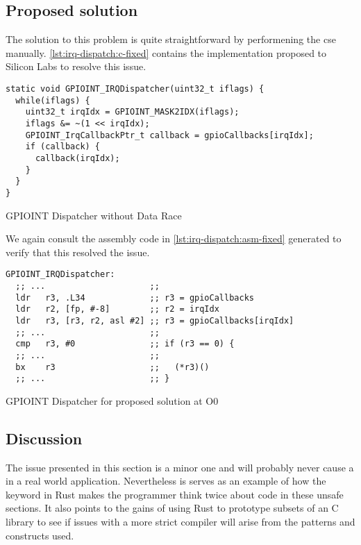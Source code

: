 \subsection{Proposed solution}

The solution to this problem is quite straightforward by performening the \gls{cse} manually.
\autoref{lst:irq-dispatch:c-fixed} contains the implementation proposed to Silicon Labs to resolve this issue.

\begin{listing}[H]
  \begin{verbatim}
static void GPIOINT_IRQDispatcher(uint32_t iflags) {
  while(iflags) {
    uint32_t irqIdx = GPIOINT_MASK2IDX(iflags);
    iflags &= ~(1 << irqIdx);
    GPIOINT_IrqCallbackPtr_t callback = gpioCallbacks[irqIdx];
    if (callback) {
      callback(irqIdx);
    }
  }
}
  \end{verbatim}
  \caption{GPIOINT Dispatcher without Data Race}
  \label{lst:irq-dispatch:c-fixed}
\end{listing}

We again consult the assembly code in \autoref{lst:irq-dispatch:asm-fixed} generated to verify that this resolved the issue.

\begin{listing}[H]
  \begin{verbatim}
GPIOINT_IRQDispatcher:
  ;; ...                     ;;
  ldr   r3, .L34             ;; r3 = gpioCallbacks
  ldr   r2, [fp, #-8]        ;; r2 = irqIdx
  ldr   r3, [r3, r2, asl #2] ;; r3 = gpioCallbacks[irqIdx]
  ;; ...                     ;;
  cmp   r3, #0               ;; if (r3 == 0) {
  ;; ...                     ;;
  bx    r3                   ;;   (*r3)()
  ;; ...                     ;; }
  \end{verbatim}
  \caption{GPIOINT Dispatcher for proposed solution at O0}
  \label{lst:irq-dispatch:asm-fixed}
\end{listing}

\subsection{Discussion}

The issue presented in this section is a minor one and will probably never cause a  in a real world application.
Nevertheless is serves as an example of how the {\unsafe} keyword in Rust makes the programmer think twice about code in these unsafe sections.
It also points to the gains of using Rust to prototype subsets of an C library to see if issues with a more strict compiler will arise from the patterns and constructs used.
